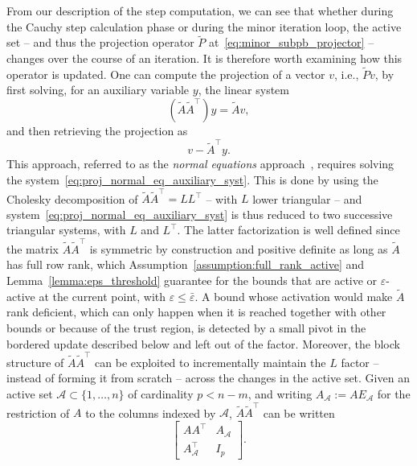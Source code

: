 \documentclass{article}
\numberwithin{equation}{section}
\newcommand{\calA}{{\mathcal{A}}}
\theoremstyle{plain}
\begin{document}
From our description of the step computation, we can see that whether during the Cauchy step calculation phase or during the minor iteration loop, the active set -- and thus the projection operator $\tilde{P}$ at~\eqref{eq:minor_subpb_projector} -- changes over the course of an iteration. It is therefore worth examining how this operator is updated. One can compute the projection of a vector $v$, i.e., $\tilde{P}v$, by first solving, for an auxiliary variable $y$, the linear system
\begin{equation}\label{eq:proj_normal_eq_auxiliary_syst}
	\left(\tilde{A}\tilde{A}^\top\right)y = \tilde{A}v,
\end{equation}
and then retrieving the projection as
\begin{equation}
	v - \tilde{A}^\top y.
\end{equation}
This approach, referred to as the \textit{normal equations} approach~\cite{gould-etal:2001}, requires solving the system~\eqref{eq:proj_normal_eq_auxiliary_syst}. This is done by using the Cholesky decomposition of $\tilde{A}\tilde{A}^\top = LL^\top$ -- with $L$ lower triangular -- and system~\eqref{eq:proj_normal_eq_auxiliary_syst} is thus reduced to two successive triangular systems, with $L$ and $L^\top$. The latter factorization is well defined since the matrix $\tilde{A}\tilde{A}^\top$ is symmetric by construction and positive definite as long as $\tilde{A}$ has full row rank, which Assumption~\ref{assumption:full_rank_active} and Lemma~\ref{lemma:eps_threshold} guarantee for the bounds that are active or $\varepsilon$-active at the current point, with $\varepsilon \le \bar\varepsilon$. A bound whose activation would make $\tilde{A}$ rank deficient, which can only happen when it is reached together with other bounds or because of the trust region, is detected by a small pivot in the bordered update described below and left out of the factor. Moreover, the block structure of $\tilde{A}\tilde{A}^\top$ can be exploited to incrementally maintain the $L$ factor -- instead of forming it from scratch -- across the changes in the active set. Given an active set $\calA \subset \{1,\ldots,n\}$ of cardinality $p < n-m$, and writing $A_\calA := AE_\calA$ for the restriction of $A$ to the columns indexed by $\calA$, $\tilde{A}\tilde{A}^\top $ can be written
\begin{equation}\label{eq:augmented_grammat}
	\begin{bmatrix}
		AA^\top &  A_{\calA} \\  A_{\calA}^\top & I_p
	\end{bmatrix}.
\end{equation}
\end{document}
